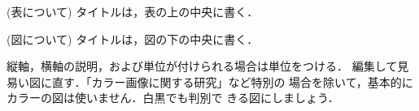 (表について) タイトルは，表の上の中央に書く．

(図について) タイトルは，図の下の中央に書く．

縦軸，横軸の説明，および単位が付けられる場合は単位をつける．
編集して見易い図に直す．「カラー画像に関する研究」など特別の
場合を除いて，基本的にカラーの図は使いません．白黒でも判別で
きる図にしましょう．